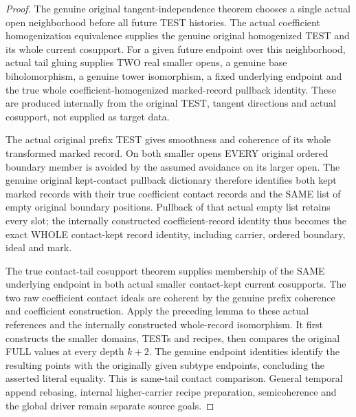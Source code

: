 \begin{proof}
The genuine original tangent-independence theorem chooses a single actual
open neighborhood before all future TEST histories. The actual coefficient
homogenization equivalence supplies the genuine original homogenized TEST
and its whole current cosupport. For a given future endpoint over this
neighborhood, actual tail gluing supplies TWO real smaller opens, a genuine
base biholomorphism, a genuine tower isomorphism, a fixed underlying
endpoint and the true whole coefficient-homogenized marked-record
pullback identity. These are produced internally from the original TEST,
tangent directions and actual cosupport, not supplied as target data.

The actual original prefix TEST gives smoothness and coherence of its
whole transformed marked record. On both smaller opens EVERY original
ordered boundary member is avoided by the assumed avoidance on its larger
open. The genuine original kept-contact pullback dictionary therefore
identifies both kept marked records with their true coefficient contact
records and the SAME list of empty original boundary positions. Pullback
of that actual empty list retains every slot; the internally constructed
coefficient-record identity thus becomes the exact WHOLE contact-kept
record identity, including carrier, ordered boundary, ideal and mark.

The true contact-tail cosupport theorem supplies membership of the SAME
underlying endpoint in both actual smaller contact-kept current cosupports.
The two raw coefficient contact ideals are coherent by the genuine prefix
coherence and coefficient construction. Apply the preceding lemma to
these actual references and the internally constructed whole-record
isomorphism. It first constructs the smaller domains, TESTs and recipes,
then compares the original FULL values at every depth $k+2$. The genuine
endpoint identities identify the resulting points with the originally
given subtype endpoints, concluding the asserted literal equality.
This is same-tail contact comparison. General temporal append rebasing,
internal higher-carrier recipe preparation, semicoherence and the global
driver remain separate source goals.
\end{proof}
